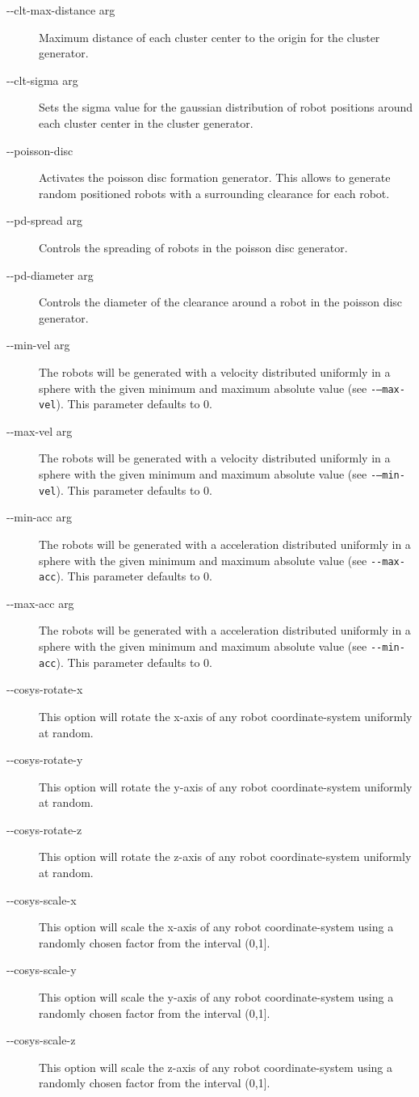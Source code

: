 \begin{description}
	\item [-{}-clt-max-distance arg] Maximum distance of each cluster center to the origin for the cluster generator.
	\item [-{}-clt-sigma arg] Sets the sigma value for the gaussian distribution of robot positions around each cluster center in the cluster generator.
 	\item [-{}-poisson-disc] Activates the poisson disc formation generator. This allows to generate random positioned robots with a surrounding clearance for each robot.
	\item [-{}-pd-spread arg] Controls the spreading of robots in the poisson disc generator.
	\item [-{}-pd-diameter arg] Controls the diameter of the clearance around a robot in the poisson disc generator.
	\item [-{}-min-vel arg] The robots will be generated with a velocity distributed uniformly in a sphere with the given minimum and maximum absolute value (see {\tt -{}---max-vel}). This parameter defaults to 0.
	\item [-{}-max-vel arg] The robots will be generated with a velocity distributed uniformly in a sphere with the given minimum and maximum absolute value (see {\tt -{}---min-vel}). This parameter defaults to 0.
	\item [-{}-min-acc arg] The robots will be generated with a acceleration distributed uniformly in a sphere with the given minimum and maximum absolute value (see {\tt -{}-max-acc}). This parameter defaults to 0.
	\item [-{}-max-acc arg] The robots will be generated with a acceleration distributed uniformly in a sphere with the given minimum and maximum absolute value (see {\tt -{}-min-acc}). This parameter defaults to 0.
	\item [-{}-cosys-rotate-x] This option will rotate the x-axis of any robot coordinate-system uniformly at random.
	\item [-{}-cosys-rotate-y] This option will rotate the y-axis of any robot coordinate-system uniformly at random.
	\item [-{}-cosys-rotate-z] This option will rotate the z-axis of any robot coordinate-system uniformly at random.
	\item [-{}-cosys-scale-x] This option will scale the x-axis of any robot coordinate-system using a randomly chosen factor from the interval (0,1].
	\item [-{}-cosys-scale-y] This option will scale the y-axis of any robot coordinate-system using a randomly chosen factor from the interval (0,1].
	\item [-{}-cosys-scale-z] This option will scale the z-axis of any robot coordinate-system using a randomly chosen factor from the interval (0,1].
\end{description}


